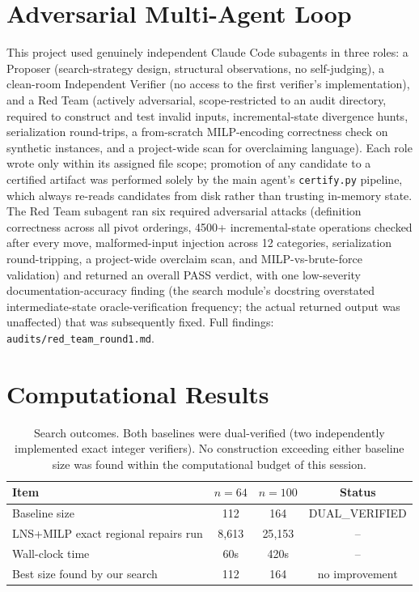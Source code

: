 \documentclass[11pt]{article}
\begin{document}
\section{Adversarial Multi-Agent Loop}

This project used genuinely independent Claude Code subagents in three roles: a
Proposer (search-strategy design, structural observations, no self-judging),
a clean-room Independent Verifier (no access to the first verifier's implementation),
and a Red Team (actively adversarial, scope-restricted to an audit directory,
required to construct and test invalid inputs, incremental-state divergence hunts,
serialization round-trips, a from-scratch MILP-encoding correctness check on
synthetic instances, and a project-wide scan for overclaiming language). Each role
wrote only within its assigned file scope; promotion of any candidate to a certified
artifact was performed solely by the main agent's \texttt{certify.py} pipeline,
which always re-reads candidates from disk rather than trusting in-memory state.
The Red Team subagent ran six required adversarial attacks (definition correctness
across all pivot orderings, 4500+ incremental-state operations checked after every
move, malformed-input injection across 12 categories, serialization round-tripping,
a project-wide overclaim scan, and MILP-vs-brute-force validation) and returned an
overall PASS verdict, with one low-severity documentation-accuracy finding (the
search module's docstring overstated intermediate-state oracle-verification
frequency; the actual returned output was unaffected) that was subsequently fixed.
Full findings: \texttt{audits/red\_team\_round1.md}.

\section{Computational Results}

\begin{table}[h]
\centering
\begin{tabular}{lccc}
\toprule
Item & $n=64$ & $n=100$ & Status \\
\midrule
Baseline size & 112 & 164 & DUAL\_VERIFIED \\
LNS+MILP exact regional repairs run & 8{,}613 & 25{,}153 & -- \\
Wall-clock time & 60s & 420s & -- \\
Best size found by our search & 112 & 164 & no improvement \\
\bottomrule
\end{tabular}
\caption{Search outcomes. Both baselines were dual-verified (two independently
implemented exact integer verifiers). No construction exceeding either baseline
size was found within the computational budget of this session.}
\end{table}
\end{document}
